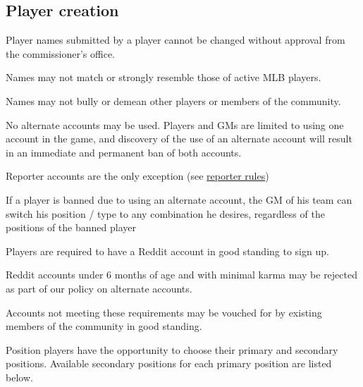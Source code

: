 \subsection{Player creation}
\begin{deepEnumerate}
	\item Player names submitted by a player cannot be changed
	without approval from the commissioner’s office.
	\begin{deepEnumerate}
		\item Names may not match or strongly resemble those of active MLB players.
		\item Names may not bully or demean other players or members of the community.
		\item No alternate accounts may be used.
		Players and GMs are limited to using one account in the game,
		and discovery of the use of an alternate account
		will result in an immediate and permanent ban of both accounts.
		\begin{deepEnumerate}
			\item Reporter accounts are the only exception (see \hyperref[sec:reporters]{reporter rules})
			\item If a player is banned due to using an alternate account, the GM of his team can switch his position / type
			 to any combination he desires, regardless of the positions of the banned player
		\end{deepEnumerate}
	\end{deepEnumerate}
	\item Players are required to have a Reddit account in good standing to sign up.
	\begin{deepEnumerate}
		\item Reddit accounts under 6 months of age and with minimal karma
		may be rejected as part of our policy on alternate accounts.
		\begin{deepEnumerate}
			\item Accounts not meeting these requirements may be vouched for
			by existing members of the community in good standing.
		\end{deepEnumerate}
	\end{deepEnumerate}
	\item Position players have the opportunity to choose their primary and secondary positions.
	Available secondary positions for each primary position are listed below.
	

\end{deepEnumerate}
